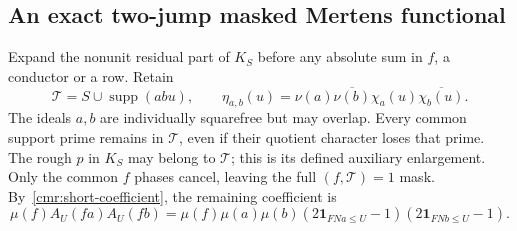\documentclass[11pt]{article}
\theoremstyle{definition}\newtheorem{definition}[theorem]{Definition}
\theoremstyle{remark}\newtheorem{remark}[theorem]{Remark}
\begin{document}
\subsection{An exact two-jump masked Mertens functional}\label{cmr:abel}
Expand the nonunit residual part of $K_S$ before any absolute sum in
$f$, a conductor or a row. Retain
\[
 \mathcal T=S\cup\operatorname{supp}(abu),\qquad
 \eta_{a,b}(u)=\nu(a)\overline{\nu(b)}
                    \chi_a(u)\overline{\chi_b(u)}.
\]
The ideals $a,b$ are individually squarefree but may overlap.
Every common support prime remains in $\mathcal T$, even if their
quotient character loses that prime. The rough $p$ in $K_S$ may
belong to $\mathcal T$; this is its defined auxiliary enlargement.
Only the common $f$ phases cancel, leaving the full $(f,\mathcal T)=1$
mask. By~\eqref{cmr:short-coefficient}, the remaining coefficient is
\[
 \mu(f)A_U(fa)A_U(fb)
  =\mu(f)\mu(a)\mu(b)
     (2\mathbf1_{FNa\le U}-1)(2\mathbf1_{FNb\le U}-1).
\]
\end{document}
